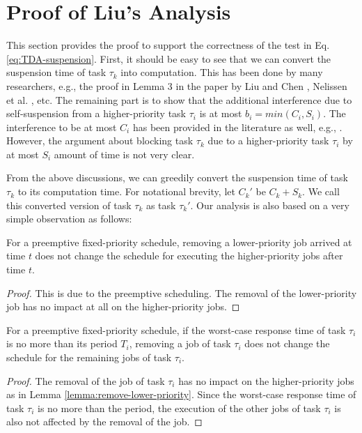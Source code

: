 
\section{Proof of Liu's Analysis}  

This section provides the proof to support the correctness of the test in Eq. \eqref{eq:TDA-suspension}. First, it should be easy to see that we can convert the suspension time of task $\tau_k$ into computation. This has been done by many researchers, e.g., the proof in Lemma 3 in the paper by Liu and Chen \cite{Liu_2014}, Nelissen et al. \cite{ecrts15nelissen}, etc. The remaining part is to show that the additional interference due to self-suspension from a higher-priority task $\tau_i$ is at most $b_i=min(C_i, S_i)$. The interference to be at most $C_i$ has been provided in the literature as well, e.g., \cite{Rajkumar_1990}\cite{Liu_2014}. However, the argument about blocking task $\tau_k$ due to a higher-priority task $\tau_i$ by at most $S_i$ amount of time is not very clear. 

From the above discussions, we can greedily convert the suspension time of task $\tau_k$ to its computation time. For notational brevity, let $C_k'$ be $C_k + S_k$. We call this converted version of task $\tau_k$ as task $\tau_k'$. Our analysis is also based on a very simple observation as follows:
\begin{lemma}
\label{lemma:remove-lower-priority}
  For a preemptive fixed-priority schedule, removing a lower-priority job arrived at time $t$ does not change the schedule for executing the higher-priority jobs after time $t$.
\end{lemma}
\begin{proof}
  This is due to the preemptive scheduling. The removal of the lower-priority job has no impact at all on the higher-priority jobs.
\end{proof}
\begin{lemma}
\label{lemma:remove-same-task}
  For a preemptive fixed-priority schedule, if the worst-case response time of task $\tau_i$ is no more than its period $T_i$, removing a job of task $\tau_i$ does not change the schedule for the remaining jobs of task $\tau_i$.
\end{lemma}
\begin{proof}
  The removal of the job of task $\tau_i$ has no impact on the higher-priority jobs as in Lemma \ref{lemma:remove-lower-priority}. Since the worst-case response time of task $\tau_i$ is no more than the period, the execution of the other jobs of task $\tau_i$ is also not affected by the removal of the job.
\end{proof}


